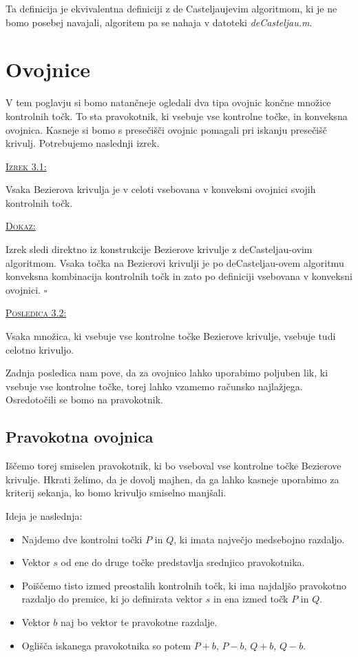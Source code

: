 \documentclass[a4paper, 12pt]{article} %
\newenvironment{matematika}[1]{
{\underline{\textsc{#1:}}}
}{
}
\begin{document}
Ta definicija je ekvivalentna definiciji z de Casteljaujevim algoritmom, ki je ne bomo posebej navajali, algoritem pa se nahaja v datoteki \emph{deCasteljau.m}.
\section{Ovojnice}

V tem poglavju si bomo natančneje ogledali dva tipa ovojnic končne množice kontrolnih točk. To sta pravokotnik, ki vsebuje vse kontrolne točke, in konveksna ovojnica. Kasneje si bomo s presečišči ovojnic pomagali pri iskanju presečišč krivulj. Potrebujemo naslednji izrek.

\begin{matematika}{Izrek 3.1}
Vsaka Bezierova krivulja je v celoti vsebovana v konveksni ovojnici svojih kontrolnih točk.
\end{matematika}

\begin{matematika}{Dokaz}
Izrek sledi direktno iz konstrukcije Bezierove krivulje z deCasteljau-ovim algoritmom. Vsaka točka na Bezierovi krivulji je po deCasteljau-ovem algoritmu konveksna kombinacija kontrolnih točk in zato po definiciji vsebovana v konveksni ovojnici. \hspace*{\fill} $\square$
\end{matematika}

\begin{matematika}{Posledica 3.2}
Vsaka množica, ki vsebuje vse kontrolne točke Bezierove krivulje, vsebuje tudi celotno krivuljo.
\end{matematika}

Zadnja posledica nam pove, da za ovojnico lahko uporabimo poljuben lik, ki vsebuje vse kontrolne točke, torej lahko vzamemo računsko najlažjega. Osredotočili se bomo na pravokotnik.

\subsection{Pravokotna ovojnica}
Iščemo torej smiselen pravokotnik, ki bo vseboval vse kontrolne točke Bezierove krivulje. Hkrati želimo, da je dovolj majhen, da ga lahko kasneje uporabimo za kriterij sekanja, ko bomo krivuljo smiselno manjšali.

Ideja je naslednja:
\begin{itemize}
\item Najdemo dve kontrolni točki $P$ in $Q$, ki imata največjo medsebojno razdaljo.
\item Vektor $s$ od ene do druge točke predstavlja srednjico pravokotnika.
\item Poiščemo tisto izmed preostalih kontrolnih točk, ki ima najdaljšo pravokotno razdaljo do premice, ki jo definirata vektor $s$ in ena izmed točk $P$ in $Q$.
\item Vektor $b$ naj bo vektor te pravokotne razdalje.
\item Oglišča iskanega pravokotnika so potem $P + b$, $P - b$, $Q + b$, $Q - b$.
\end{itemize}
\end{document}
